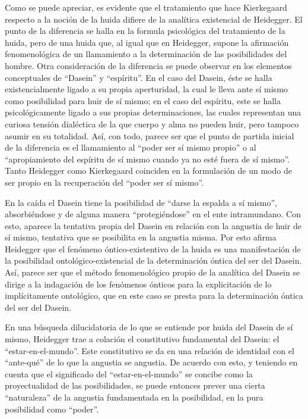 \begin{refsection}
Como se puede apreciar, es evidente que el tratamiento que hace Kierkegaard respecto a la noción de la huida difiere de la analítica existencial de Heidegger. El punto de la diferencia se halla en la formula psicológica del tratamiento de la huida, pero de una huida que, al igual que en Heidegger, supone la afirmación fenomenológica de un llamamiento a la determinación de las posibilidades del hombre. Otra consideración de la diferencia se puede observar en los elementos conceptuales de ``Dasein'' y ``espíritu''. En el caso del Dasein, éste se halla existencialmente ligado a su propia aperturidad, la cual le lleva ante sí mismo como posibilidad para huir de sí mismo; en el caso del espíritu, este se halla psicológicamente ligado a sus propias determinaciones, las cuales representan una curiosa tensión dialéctica de la que cuerpo y alma no pueden huir, pero tampoco asumir en su totalidad. Así, con todo, parece ser que el punto de partida inicial de la diferencia es el llamamiento al ``poder ser sí mismo propio'' o al ``apropiamiento del espíritu de sí mismo cuando ya no esté fuera de sí mismo''. Tanto Heidegger como Kierkegaard coinciden en la formulación de un modo de ser propio en la recuperación del ``poder ser sí mismo''.

En la caída el Dasein tiene la posibilidad de ``darse la espalda a sí mismo'', absorbiéndose y de alguna manera ``protegiéndose'' en el ente intramundano. Con esto, aparece la tentativa propia del Dasein en relación con la angustia de huir de sí mismo, tentativa que se posibilita en la angustia misma. Por esto afirma Heidegger que el fenómeno óntico-existentivo de la huida es una manifestación de la posibilidad ontológico-existencial de la determinación óntica del ser del Dasein. Así, parece ser que el método fenomenológico propio de la analítica del Dasein se dirige a la indagación de los fenómenos ónticos para la explicitación de lo implícitamente ontológico, que en este caso se presta para la determinación óntica del ser del Dasein.

En una búsqueda dilucidatoria de lo que se entiende por huida del Dasein de sí mismo, Heidegger trae a colación el constitutivo fundamental del Dasein: el ``estar-en-el-mundo''. Este constitutivo se da en una relación de identidad con el ``ante-qué'' de lo que la angustia se angustia. De acuerdo con esto, y teniendo en cuenta que el significado del ``estar-en-el-mundo'' se concibe como la proyectualidad de las posibilidades, se puede entonces prever una cierta ``naturaleza'' de la angustia fundamentada en la posibilidad, en la pura posibilidad como ``poder''.


\end{refsection}
